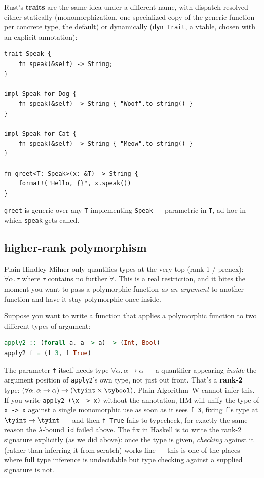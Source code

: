 Rust's \textbf{traits} are the same idea under a different name, with dispatch resolved either statically (monomorphization, one specialized copy of the generic function per concrete type, the default) or dynamically (\lstinline|dyn Trait|, a vtable, chosen with an explicit annotation):
\begin{lstlisting}
trait Speak {
    fn speak(&self) -> String;
}

impl Speak for Dog {
    fn speak(&self) -> String { "Woof".to_string() }
}

impl Speak for Cat {
    fn speak(&self) -> String { "Meow".to_string() }
}

fn greet<T: Speak>(x: &T) -> String {
    format!("Hello, {}", x.speak())
}
\end{lstlisting}
\lstinline|greet| is generic over any \lstinline|T| implementing \lstinline|Speak| — parametric in \lstinline|T|, ad-hoc in which \lstinline|speak| gets called.

\subsection{higher-rank polymorphism}

Plain Hindley-Milner only quantifies types at the very top (rank-1 / prenex): $\forall\alpha.\,\tau$ where $\tau$ contains no further $\forall$. This is a real restriction, and it bites the moment you want to pass a polymorphic function \emph{as an argument} to another function and have it stay polymorphic once inside.

\begin{example}
Suppose you want to write a function that applies a polymorphic function to two different types of argument:
\begin{lstlisting}[language=Haskell]
apply2 :: (forall a. a -> a) -> (Int, Bool)
apply2 f = (f 3, f True)
\end{lstlisting}
The parameter \lstinline|f| itself needs type $\forall\alpha.\,\alpha\to\alpha$ — a quantifier appearing \emph{inside} the argument position of \lstinline|apply2|'s own type, not just out front. That's a \textbf{rank-2} type: $(\forall\alpha.\,\alpha\to\alpha) \to (\tyint \times \tybool)$. Plain Algorithm~W cannot infer this. If you write \lstinline|apply2 (\x -> x)| without the annotation, HM will unify the type of \lstinline|x -> x| against a single monomorphic use as soon as it sees \lstinline|f 3|, fixing \lstinline|f|'s type at $\tyint\to\tyint$ — and then \lstinline|f True| fails to typecheck, for exactly the same reason the $\lambda$-bound \lstinline|id| failed above. The fix in Haskell is to write the rank-2 signature explicitly (as we did above): once the type is given, \emph{checking} against it (rather than inferring it from scratch) works fine — this is one of the places where full type inference is undecidable but type checking against a supplied signature is not.
\end{example}

